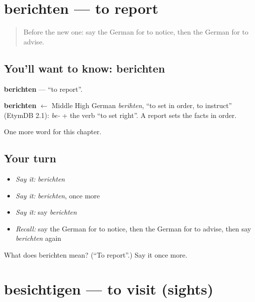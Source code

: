 \section[berichten]{berichten — to report}

\label{lesson:GE-C246-berichten}



\begin{quote}
Before the new one: say the German for to notice, then the German for to advise.
\end{quote}

\subsection*{You'll want to know: berichten}
\textbf{berichten} — \textquotedblleft{}to report\textquotedblright{}.

\begin{cousinweb}
\textbf{berichten} $\leftarrow$ Middle High German \emph{berihten}, \textquotedblleft{}to set in order, to instruct\textquotedblright{} (EtymDB 2.1): \emph{be-} + the verb \textquotedblleft{}to set right\textquotedblright{}. A report sets the facts in order.
\end{cousinweb}

\begin{grammarlens}[title={What you've built}]
One more word for this chapter.
\end{grammarlens}

\subsection*{Your turn}
\begin{itemize}
\raggedright
  \item \emph{Say it:} \emph{berichten}
  \item \emph{Say it:} \emph{berichten}, once more
  \item \emph{Say it:} say \emph{berichten}
  \item \emph{Recall:} say the German for to notice, then the German for to advise, then say \emph{berichten} again
\end{itemize}

\begin{tcolorbox}[breakable,colback=teal!4,colframe=teal!35!black,title={Before you move on}]
What does berichten mean? (\textquotedblleft{}To report\textquotedblright{}.) Say it once more.
\end{tcolorbox}
\section[besichtigen]{besichtigen — to visit (sights)}

